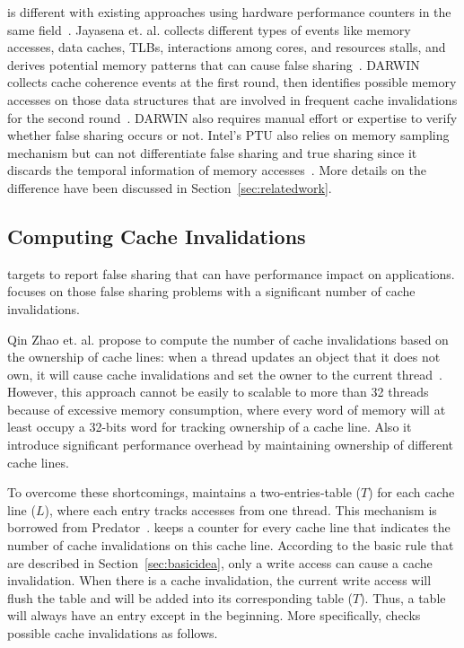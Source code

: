 \cheetah{} is different with existing approaches using hardware performance counters in the same field~\cite{mldetect, openmp, detect:ptu}. Jayasena et. al. collects different types of events like memory accesses, data caches, TLBs, interactions among cores, and resources stalls, and derives potential memory patterns that can cause false sharing~\cite{mldetect}. DARWIN collects cache coherence events at the first round, then identifies possible memory accesses on those data structures that are involved in frequent cache invalidations for the second round~\cite{openmp}. DARWIN also requires manual effort or expertise to verify whether false sharing occurs or not.  Intel's PTU also relies on memory sampling mechanism but can not differentiate false sharing and true sharing since it discards the temporal information of memory accesses~\cite{detect:ptu}. More details on the difference have been discussed in Section~\ref{sec:relatedwork}.



\subsection{Computing Cache Invalidations}
\label{sec:computeinvalidations}

\Cheetah{} targets to report false sharing that can have performance impact on applications. \Cheetah{} focuses on those false sharing problems with a significant number of cache invalidations.  

Qin Zhao et. al. propose to compute the number of cache invalidations based on the ownership of cache lines: when a thread updates an object that it does not own, it will cause cache invalidations and set the owner to the current thread~\cite{qinzhao}. However, this approach cannot be easily to scalable to more than 32 threads because of excessive memory consumption, where every word of memory will at least occupy a 32-bits word for tracking ownership of a cache line. Also it introduce significant performance overhead by maintaining ownership of different cache lines. 

To overcome these shortcomings, \Cheetah{} maintains a two-entries-table ($T$) for each cache line ($L$), where each entry tracks accesses from one thread. This mechanism is borrowed from Predator~\cite{Predator}. \Cheetah{} keeps a counter for every cache line that indicates the number of cache invalidations on this cache line.  
According to the basic rule that are described in Section~\ref{sec:basicidea}, only a write access can cause a cache invalidation. When there is a cache invalidation, the current write access will flush the table and will be added into its corresponding table ($T$). Thus, a table will always have an entry except in the beginning. More specifically, \cheetah{} checks possible cache invalidations as follows.
 
